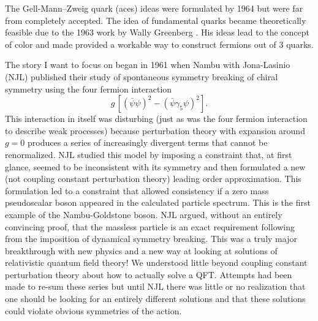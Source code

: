 \documentclass[preprintnumbers,12pt]{revtex4-2}
\begin{document}
The Gell-Mann--Zweig quark (aces) ideas were formulated by 1964
\cite{gm;1964,gz;1964} but were far from completely accepted. The idea
of fundamental quarks became theoretically feasible due to the 1963
work by Wally Greenberg \cite{wag;1964}. His ideas lead to the concept
of color and made provided a workable way to construct fermions out of
3 quarks.

The story I want to focus on began in 1961 when Nambu with
Jona-Lasinio (NJL)  published \cite{nb;1960,nb;1961} their study of
spontaneous symmetry breaking of chiral symmetry using the four fermion
interaction
\begin{equation*}
  g\, \left[ (\bar{\psi}\psi)^2 - (\bar{\psi}\gamma_{5}\psi)^2 \right].
\end{equation*}
This interaction in itself was disturbing (just as was the four
fermion interaction to describe weak processes) because perturbation
theory with expansion around $g=0$ produces a series of increasingly
divergent terms that cannot be renormalized. NJL studied this model by
imposing a constraint that, at first glance, seemed to be inconsistent
with its symmetry and then formulated a new (not coupling constant
perturbation theory) leading order approximation. This formulation led
to a constraint that allowed consistency if a zero mass pseudoscalar
boson appeared in the calculated particle spectrum. This is the first
example of the Nambu-Goldstone boson.  NJL argued, without an
entirely convincing proof, that the massless particle is an exact
requirement following from the imposition of dynamical symmetry
breaking. This was a truly major breakthrough with new physics and a
new way at looking at solutions of relativistic quantum field theory!
We understood little beyond coupling constant perturbation theory
about how to actually solve a QFT. Attempts had been made to re-sum
these series but until NJL there was little or no realization that one
should be looking for an entirely different solutions and that these solutions could violate
obvious symmetries of the action.
\end{document}
